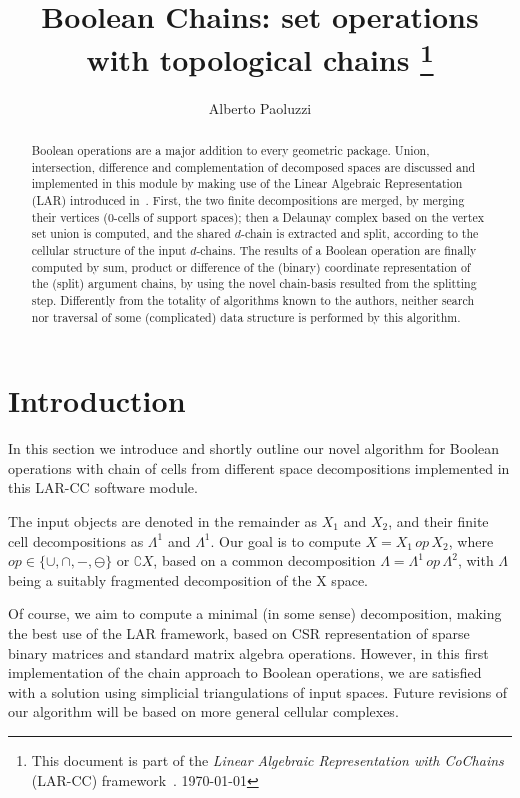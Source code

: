 \documentclass[11pt,oneside]{article}	%
\title{Boolean Chains: set operations with topological chains
\footnote{This document is part of the \emph{Linear Algebraic Representation with CoChains} (LAR-CC) framework~\cite{cclar-proj:2013:00}. \today}
}
\author{Alberto Paoluzzi}
\begin{document}
\maketitle

\begin{abstract}
Boolean operations are a major addition to every geometric package. Union, intersection, difference and complementation of decomposed spaces are discussed and implemented in this module by making use of the Linear Algebraic Representation (LAR) introduced in~\cite{Dicarlo:2014:TNL:2543138.2543294}. First, the two finite decompositions are merged, by merging their vertices (0-cells of support spaces); then a Delaunay complex based on the vertex set union is computed, and the shared $d$-chain is extracted and split, according to the cellular structure of the input $d$-chains. The results of a Boolean operation are finally computed by sum, product or difference of the (binary) coordinate representation of the (split) argument chains, by using the novel chain-basis resulted from the splitting step. Differently from the totality of algorithms known to the authors, neither search nor traversal of some (complicated) data structure is performed by this algorithm. 
\end{abstract}

\tableofcontents
\section{Introduction}

In this section we introduce and shortly outline our novel algorithm for Boolean operations with chain of cells from different space decompositions implemented in this LAR-CC software module.

The input objects are denoted in the remainder as $X_1$ and $X_2$, and their finite cell decompositions as $\Lambda^1$ and $\Lambda^1$. Our goal is to compute $X = X_1\, op\, X_2$, where $op \in \{\cup ,\cap , - ,\ominus \}$ or $\complement X$, based on a common decomposition $\Lambda = \Lambda^1\, op\, \Lambda^2$, with $\Lambda$ being a suitably fragmented decomposition of the X space.

Of course, we aim to compute a minimal (in some sense) decomposition, making the best use of the LAR framework, based on CSR representation of sparse binary matrices and standard matrix algebra operations.
However, in this first implementation of the chain approach to Boolean operations, we are satisfied with a solution using simplicial triangulations of input spaces. Future revisions of our algorithm will be based on more general cellular complexes.
\end{document}
